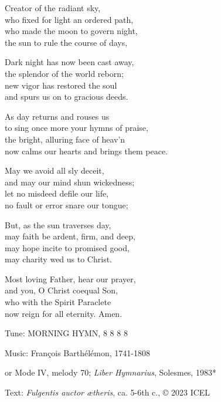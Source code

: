 \hymn

\begin{hymnverse}
Creator of the radiant sky,\\
who fixed for light an ordered path,\\
who made the moon to govern night,\\
the sun to rule the course of days,

Dark night has now been cast away,\\
the splendor of the world reborn;\\
new vigor has restored the soul\\
and spurs us on to gracious deeds.

As day returns and rouses us\\
to sing once more your hymns of praise,\\
the bright, alluring face of heav’n\\
now calms our hearts and brings them peace.

May we avoid all sly deceit,\\
and may our mind shun wickedness;\\
let no misdeed defile our life,\\
no fault or error snare our tongue;

But, as the sun traverses day,\\
may faith be ardent, firm, and deep,\\
may hope incite to promised good,\\
may charity wed us to Christ.

Most loving Father, hear our prayer,\\
and you, O Christ coequal Son,\\
who with the Spirit Paraclete\\
now reign for all eternity. Amen.
\end{hymnverse}

\begin{hymnsource}
Tune: MORNING HYMN, 8 8 8 8

Music: François Barthélémon, 1741-1808

or Mode IV, melody 70; \emph{Liber Hymnarius}, Solesmes, 1983*

Text: \emph{Fulgentis auctor ætheris}, ca. 5-6th c., © 2023 ICEL
\end{hymnsource}